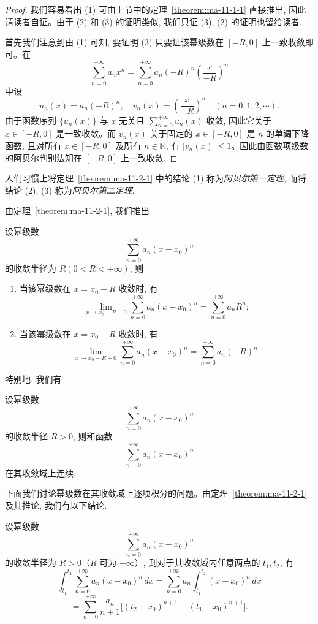 \begin{proof}
我们容易看出 (1) 可由上节中的定理~\ref{theorem:ma-11-1-1} 直接推出, 因此请读者自证。由于 (2) 和 (3) 的证明类似, 我们只证 (3), (2) 的证明也留给读者.

首先我们注意到由 (1) 可知, 要证明 (3) 只要证该幂级数在 $[-R,0]$ 上一致收敛即可。在
\[
  \sum_{n=0}^{+\infty}a_nx^n
  =
  \sum_{n=0}^{+\infty}a_n(-R)^n\left(\frac{x}{-R}\right)^n
\]
中设
\[
  u_n(x)=a_n(-R)^n,\quad
  v_n(x)=\left(\frac{x}{-R}\right)^n
  \quad(n=0,1,2,\cdots).
\]
由于函数序列 $\{u_n(x)\}$ 与 $x$ 无关且 $\sum_{n=0}^{+\infty}u_n(x)$ 收敛, 因此它关于 $x\in[-R,0]$ 是一致收敛。而 $v_n(x)$ 关于固定的 $x\in[-R,0]$ 是 $n$ 的单调下降函数, 且对所有 $x\in[-R,0]$ 及所有 $n\in\mathbb N$, 有 $|v_n(x)|\leqslant1$。因此由函数项级数的阿贝尔判别法知在 $[-R,0]$ 上一致收敛.
\end{proof}


人们习惯上将定理~\ref{theorem:ma-11-2-1} 中的结论 (1) 称为\emph{阿贝尔第一定理}, 而将结论 (2), (3) 称为\emph{阿贝尔第二定理}.

由定理~\ref{theorem:ma-11-2-1}, 我们推出

\begin{corollary}\label{corollary:ma-local-11.2-1}
设幂级数
\[
  \sum_{n=0}^{+\infty}a_n(x-x_0)^n
\]
的收敛半径为 $R(0<R<+\infty)$, 则
\begin{enumerate}
  \item 当该幂级数在 $x=x_0+R$ 收敛时, 有
  \[
    \lim_{x\to x_0+R-0}
    \sum_{n=0}^{+\infty}a_n(x-x_0)^n
    =
    \sum_{n=0}^{+\infty}a_nR^n;
  \]
  \item 当该幂级数在 $x=x_0-R$ 收敛时, 有
  \[
    \lim_{x\to x_0-R+0}
    \sum_{n=0}^{+\infty}a_n(x-x_0)^n
    =
    \sum_{n=0}^{+\infty}a_n(-R)^n.
  \]
\end{enumerate}
特别地, 我们有
\end{corollary}


\begin{corollary}\label{corollary:ma-local-11.2-2}
设幂级数
\[
  \sum_{n=0}^{+\infty}a_n(x-x_0)^n
\]
的收敛半径 $R>0$, 则和函数
\[
  \sum_{n=0}^{+\infty}a_n(x-x_0)^n
\]
在其收敛域上连续.
\end{corollary}

下面我们讨论幂级数在其收敛域上逐项积分的问题。由定理~\ref{theorem:ma-11-2-1} 及其推论, 我们有以下结论.

\begin{theorem}\label{theorem:ma-11-2-2}
设幂级数
\[
  \sum_{n=0}^{+\infty}a_n(x-x_0)^n
\]
的收敛半径为 $R>0$（$R$ 可为 $+\infty$）, 则对于其收敛域内任意两点的 $t_1,t_2$, 有
\[
  \int_{t_1}^{t_2}\sum_{n=0}^{+\infty}a_n(x-x_0)^n\,dx
  =
  \sum_{n=0}^{+\infty}a_n\int_{t_1}^{t_2}(x-x_0)^n\,dx
\]
\[
  =
  \sum_{n=0}^{+\infty}\frac{a_n}{n+1}
  \bigl[(t_2-x_0)^{n+1}-(t_1-x_0)^{n+1}\bigr].
\]
\end{theorem}



